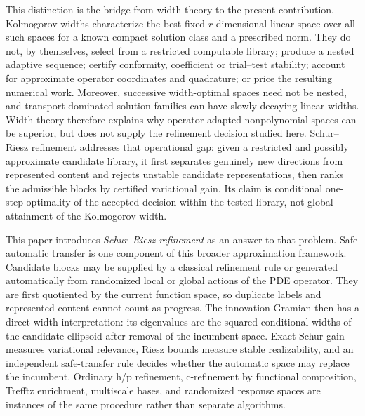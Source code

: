 \documentclass[11pt]{article}
\numberwithin{algorithm}{section}
\theoremstyle{definition}\newtheorem{definition}[theorem]{Definition}
\theoremstyle{remark}\newtheorem{remark}[theorem]{Remark}
\begin{document}
This distinction is the bridge from width theory to the present contribution.
Kolmogorov widths characterize the best fixed $r$-dimensional linear space
over all such spaces for a known compact solution class and a prescribed norm.
They do not, by themselves, select from a restricted computable library;
produce a nested adaptive sequence; certify conformity, coefficient or
trial--test stability; account for approximate operator coordinates and
quadrature; or price the resulting numerical work.  Moreover, successive
width-optimal spaces need not be nested, and transport-dominated solution
families can have slowly decaying linear widths.  Width theory therefore
explains why operator-adapted nonpolynomial spaces can be superior, but does
not supply the refinement decision studied here.  Schur--Riesz refinement
addresses that operational gap: given a restricted and possibly approximate
candidate library, it first separates genuinely new directions from represented
content and rejects unstable candidate representations, then ranks the admissible blocks by
certified variational gain.  Its claim is
conditional one-step optimality of the accepted decision within the tested library,
not global attainment of the Kolmogorov width.

This paper introduces \emph{Schur--Riesz refinement} as an answer to that
problem.  Safe automatic transfer is one component of this broader
approximation framework. Candidate blocks may be supplied by a classical refinement rule or
generated automatically from randomized local or global actions of the PDE
operator.  They are first quotiented by the current function space, so
duplicate labels and represented content cannot count as progress.  The
innovation Gramian then has a direct width interpretation: its eigenvalues are
the squared conditional widths of the candidate ellipsoid after removal of the
incumbent space.  Exact Schur gain measures variational relevance, Riesz bounds
measure stable realizability, and an independent safe-transfer rule decides
whether the automatic space may replace the incumbent.  Ordinary h/p
refinement, c-refinement by functional composition, Trefftz enrichment,
multiscale bases, and randomized response spaces are instances of the same
procedure rather than separate algorithms.
\end{document}
